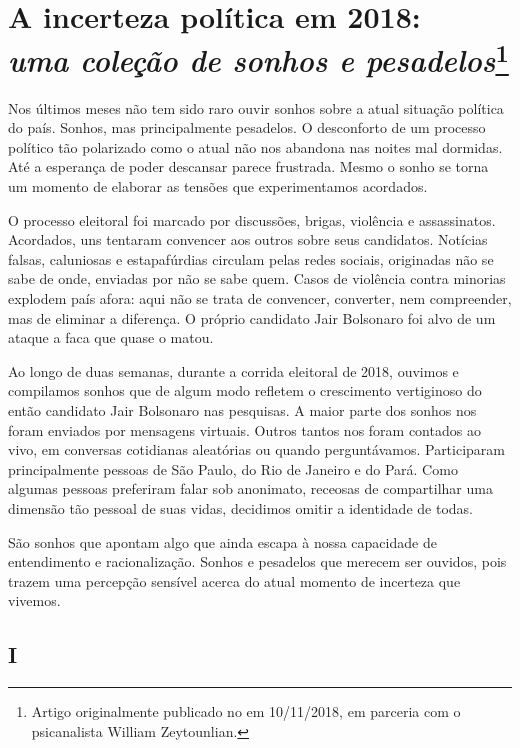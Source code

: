 \chapter*{A incerteza política em 2018:\\ \emph{uma coleção de sonhos e pesadelos}\footnote{Artigo originalmente publicado no {} em 10/11/2018, em parceria com o psicanalista William Zeytounlian.}}

\label{sonhos}

Nos últimos meses não tem sido raro ouvir sonhos sobre a atual situação
política do país. Sonhos, mas principalmente pesadelos. O desconforto de
um processo político tão polarizado como o atual não nos abandona nas
noites mal dormidas. Até a esperança de poder descansar parece
frustrada. Mesmo o sonho se torna um momento de elaborar as tensões que
experimentamos acordados.

O processo eleitoral foi marcado por discussões, brigas, violência e
assassinatos. Acordados, uns tentaram convencer aos outros sobre seus
candidatos. Notícias falsas, caluniosas e estapafúrdias circulam pelas
redes sociais, originadas não se sabe de onde, enviadas por não se sabe
quem. Casos de violência contra minorias explodem país afora: aqui não
se trata de convencer, converter, nem compreender, mas de eliminar a
diferença. O próprio candidato Jair Bolsonaro foi alvo de um ataque a
faca que quase o matou.

Ao longo de duas semanas, durante a corrida eleitoral de 2018, ouvimos e
compilamos sonhos que de algum modo refletem o crescimento vertiginoso
do então candidato Jair Bolsonaro nas pesquisas. A maior parte dos
sonhos nos foram enviados por mensagens virtuais. Outros tantos nos
foram contados ao vivo, em conversas cotidianas aleatórias ou quando
perguntávamos. Participaram principalmente pessoas de São Paulo, do Rio
de Janeiro e do Pará. Como algumas pessoas preferiram falar sob
anonimato, receosas de compartilhar uma dimensão tão pessoal de suas
vidas, decidimos omitir a identidade de todas.

São sonhos que apontam algo que ainda escapa à nossa capacidade de
entendimento e racionalização. Sonhos e pesadelos que merecem ser
ouvidos, pois trazem uma percepção sensível acerca do atual momento de
incerteza que vivemos.

\section*{I}

